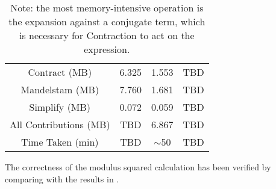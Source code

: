 \documentclass[main.tex]{subfiles}
\begin{document}
\begin{table}[htbp]
\begin{tabular}{|c|c|c|c|}
        Contract (MB) & 6.325 & 1.553 & TBD \\
        Mandelstam (MB) & 7.760 & 1.681 & TBD \\
        Simplify (MB) & 0.072 & 0.059 & TBD \\
        All Contributions (MB) & TBD & 6.867 & TBD \\
        Time Taken (min) & TBD & $\sim$50 & TBD \\
        \hline
    \end{tabular}
    \caption*{Note: the most memory-intensive operation is the expansion against a conjugate term, which is necessary for Contraction to act on the expression.}
\end{table}

The correctness of the modulus squared calculation has been verified by comparing with the results in \cite{Ellis:1996mzs,BERENDS1981124}.
\end{document}
